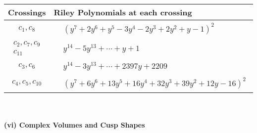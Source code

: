 \documentclass[1p]{elsarticle_modified}
\theoremstyle{definition}
\begin{document}
\begin{tabular}{m{50pt}|m{274pt}}
Crossings & \hspace{64pt}Riley Polynomials at each crossing \\
\hline $$\begin{aligned}c_{1},c_{8}\end{aligned}$$&$\begin{aligned}
&(y^7+2 y^6+y^5-3 y^4-2 y^3+2 y^2+y-1)^2
\end{aligned}$\\
\hline $$\begin{aligned}c_{2},c_{7},c_{9}\\c_{11}\end{aligned}$$&$\begin{aligned}
&y^{14}-5 y^{13}+\cdots+y+1
\end{aligned}$\\
\hline $$\begin{aligned}c_{3},c_{6}\end{aligned}$$&$\begin{aligned}
&y^{14}-3 y^{13}+\cdots+2397 y+2209
\end{aligned}$\\
\hline $$\begin{aligned}c_{4},c_{5},c_{10}\end{aligned}$$&$\begin{aligned}
&(y^7+6 y^6+13 y^5+16 y^4+32 y^3+39 y^2+12 y-16)^2
\end{aligned}$\\
\hline
\end{tabular}\\~\\
\newpage\flushleft \textbf{(vi) Complex Volumes and Cusp Shapes}
\end{document}
